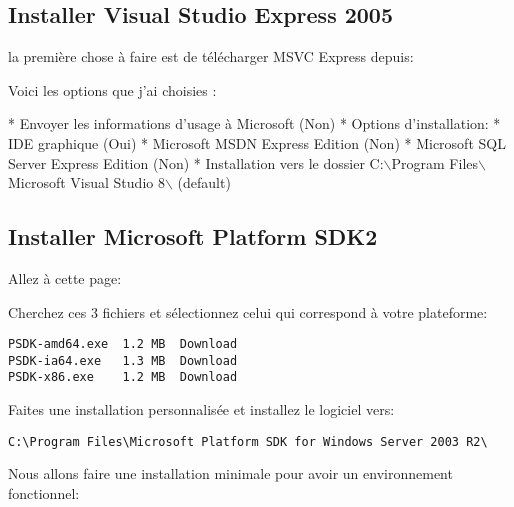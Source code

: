 \subsection{Installer Visual Studio Express 2005}
la première chose à faire est de télécharger MSVC Express depuis:


Voici les options que j'ai choisies :

 * Envoyer les informations d'usage à Microsoft (Non)
 * Options d'installation:
   * IDE  graphique                      (Oui)
   * Microsoft MSDN Express Edition        (Non)
   * Microsoft SQL Server Express Edition  (Non)
 * Installation vers le dossier C:$\backslash$Program Files$\backslash$Microsoft Visual
Studio 8$\backslash$   (default)

\subsection{Installer Microsoft Platform SDK2}
Allez à cette page:


Cherchez ces 3 fichiers et sélectionnez celui qui correspond à votre plateforme:

\begin{verbatim}
PSDK-amd64.exe  1.2 MB  Download 
PSDK-ia64.exe   1.3 MB  Download 
PSDK-x86.exe    1.2 MB  Download
\end{verbatim}

Faites une installation personnalisée et installez le logiciel vers:

\begin{verbatim}
C:\Program Files\Microsoft Platform SDK for Windows Server 2003 R2\
\end{verbatim}

Nous allons faire une installation minimale pour avoir un environnement fonctionnel:


